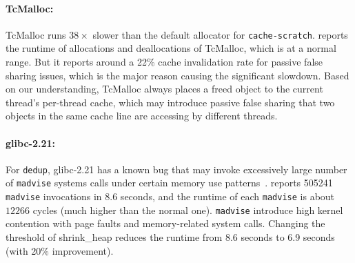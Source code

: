 
\paragraph{TcMalloc:}
TcMalloc runs $38\times$ slower than the default allocator for \texttt{cache-scratch}. \MP{} reports the runtime of allocations and deallocations of TcMalloc, which is at a normal range. But it reports around a 22\% cache invalidation rate for passive false sharing issues, which is the major reason causing the significant slowdown.  
Based on our understanding, TcMalloc always places a freed object to the current thread's per-thread cache, which may introduce passive false sharing that two objects in the same cache line are accessing by different threads. 

\paragraph{glibc-2.21:}  For \texttt{dedup}, glibc-2.21 has a known bug that may invoke excessively large number of \texttt{madvise} systems calls under certain memory use patterns~\cite{madvise}. \MP{} reports 505241 \texttt{madvise} invocations in 8.6 seconds, and the runtime of each \texttt{madvise} is about $12266$ cycles (much higher than the normal one). \texttt{madvise} introduce high kernel contention with page faults and memory-related system calls. Changing the threshold of shrink\_heap reduces the runtime from 8.6 seconds to 6.9 seconds (with 20\% improvement).


